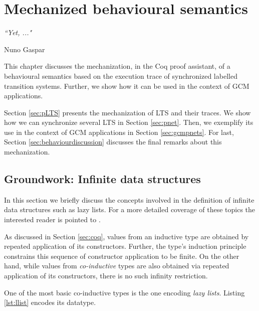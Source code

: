 
\chapter{Mechanized behavioural semantics} 
\label{chap:behaviour} 

\epigraph{\textit{“Yet, ..."}}{Nuno Gaspar}



\minitoc




	This chapter discusses the mechanization, in the Coq proof assistant, of a behavioural 
semantics based on the execution trace of synchronized labelled transition systems. Further, we show
how it can be used in the context of \ac{GCM} applications.

	Section \ref{sec:pLTS} presents the mechanization of \ac{LTS} and
their traces. We show how we can synchronize several \ac{LTS} in Section \ref{sec:pnet}.
Then, we exemplify its use in the context of \ac{GCM} applications in Section \ref{sec:gcmpnets}.
For last, Section \ref{sec:behaviourdiscussion} discusses the final remarks about this
mechanization.



\section{Groundwork: Infinite data structures}
\label{sec:groundwork}

	In this section we briefly discuss the concepts involved in the definition of infinite data structures such as lazy lists.	
	For a more detailed coverage of these topics the interested
	reader is pointed to \cite[chap. 13]{opac-b1101046}.


	As discussed in Section \ref{sec:coq}, values from an inductive type are obtained by repeated application of
	its constructors. Further, the type's induction principle constrains this sequence of constructor application
	to be finite. On the other hand, while values from \textit{co-inductive} types are also obtained via repeated 
	application of its constructors, there is no such infinity restriction.

	One of the most basic co-inductive types is the one encoding \textit{lazy lists}. Listing \ref{lst:llist}
	encodes its datatype.
	

